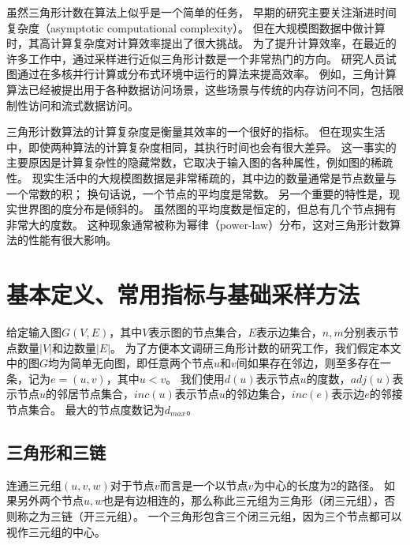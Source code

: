 虽然三角形计数在算法上似乎是一个简单的任务，
早期的研究主要关注渐进时间复杂度（asymptotic computational complexity）\citep{itai1978finding, alon1997finding}。
但在大规模图数据中做计算时，其高计算复杂度对计算效率提出了很大挑战。
为了提升计算效率，在最近的许多工作中，通过采样进行近似三角形计数是一个非常热门的方向\citep{tsourakakis2008fast,rahman2014sampling,rahman2013approximate,tsourakakis2009doulion,jha2015space,seshadhri2013triadic}。
研究人员试图通过在多核并行计算或分布式环境中运行的算法来提高效率\citep{rahman2013approximate,tsourakakis2009doulion,suri2011counting}。
例如，三角计算算法已经被提出用于各种数据访问场景，这些场景与传统的内存访问不同，包括限制性访问\citep{rahman2014sampling}和流式数据访问\citep{seshadhri2013triadic,buriol2006counting}。

三角形计数算法的计算复杂度是衡量其效率的一个很好的指标。
但在现实生活中，即使两种算法的计算复杂度相同，其执行时间也会有很大差异。
这一事实的主要原因是计算复杂性的隐藏常数，它取决于输入图的各种属性，例如图的稀疏性。
现实生活中的大规模图数据是非常稀疏的，其中边的数量通常是节点数量与一个常数的积；
换句话说，一个节点的平均度是常数。
另一个重要的特性是，现实世界图的度分布是倾斜的。
虽然图的平均度数是恒定的，但总有几个节点拥有非常大的度数。
这种现象通常被称为幂律（power-law）分布\citep{barabasi1999emergence}，这对三角形计数算法的性能有很大影响。

\chapter{基本定义、常用指标与基础采样方法}

给定输入图$G(V,E)$，其中$V$表示图的节点集合，$E$表示边集合，$n,m$分别表示节点数量$|V|$和边数量$|E|$。
为了方便本文调研三角形计数的研究工作，我们假定本文中的图$G$均为简单无向图，即任意两个节点$u$和$v$间如果存在邻边，则至多存在一条，记为$e=(u,v)$，其中$u < v$。
我们使用$d(u)$表示节点$u$的度数，$adj(u)$表示节点$u$的邻居节点集合，$inc(u)$表示节点$u$的邻边集合，$inc(e)$表示边$e$的邻接节点集合。
最大的节点度数记为$d_{max}$。

\section{三角形和三链}

连通三元组$(u,v,w)$对于节点$v$而言是一个以节点$v$为中心的长度为2的路径。
如果另外两个节点$u,w$也是有边相连的，那么称此三元组为三角形（闭三元组），否则称之为三链（开三元组）。
一个三角形包含三个闭三元组，因为三个节点都可以视作三元组的中心。

